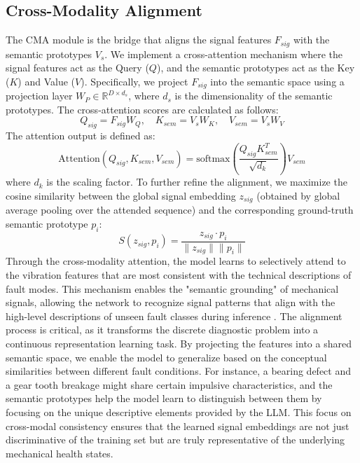 \subsection{Cross-Modality Alignment}
The CMA module is the bridge that aligns the signal features $F_{sig}$ with the semantic prototypes $V_s$. We implement a cross-attention mechanism where the signal features act as the Query ($Q$), and the semantic prototypes act as the Key ($K$) and Value ($V$). Specifically, we project $F_{sig}$ into the semantic space using a projection layer $W_P \in \mathbb{R}^{D \times d_s}$, where $d_s$ is the dimensionality of the semantic prototypes. The cross-attention scores are calculated as follows:
\begin{equation}
Q_{sig} = F_{sig} W_Q , \quad K_{sem} = V_s W_K , \quad V_{sem} = V_s W_V
\end{equation}
The attention output is defined as:
\begin{equation}
\text{Attention}(Q_{sig}, K_{sem}, V_{sem}) = \text{softmax}\left(\frac{Q_{sig} K_{sem}^T}{\sqrt{d_k}}\right) V_{sem}
\end{equation}
where $d_k$ is the scaling factor. To further refine the alignment, we maximize the cosine similarity between the global signal embedding $z_{sig}$ (obtained by global average pooling over the attended sequence) and the corresponding ground-truth semantic prototype $p_i$:
\begin{equation}
S(z_{sig}, p_i) = \frac{z_{sig} \cdot p_i}{\|z_{sig}\| \|p_i\|}
\end{equation}
Through the cross-modality attention, the model learns to selectively attend to the vibration features that are most consistent with the technical descriptions of fault modes. This mechanism enables the "semantic grounding" of mechanical signals, allowing the network to recognize signal patterns that align with the high-level descriptions of unseen fault classes during inference \cite{li2024crossmodality}. The alignment process is critical, as it transforms the discrete diagnostic problem into a continuous representation learning task. By projecting the features into a shared semantic space, we enable the model to generalize based on the conceptual similarities between different fault conditions. For instance, a bearing defect and a gear tooth breakage might share certain impulsive characteristics, and the semantic prototypes help the model learn to distinguish between them by focusing on the unique descriptive elements provided by the LLM. This focus on cross-modal consistency ensures that the learned signal embeddings are not just discriminative of the training set but are truly representative of the underlying mechanical health states.

